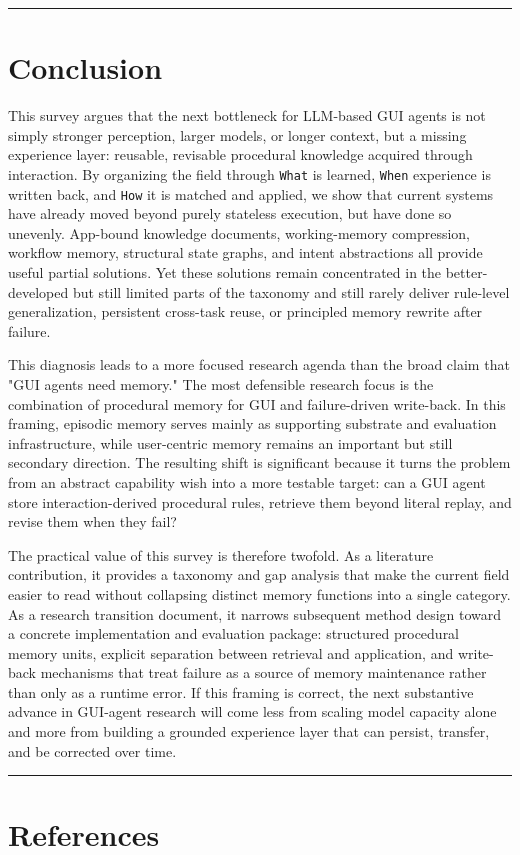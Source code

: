 \documentclass{article}
\begin{document}
\begin{center}\rule{0.5\linewidth}{0.5pt}\end{center}

\section{Conclusion}\label{10-conclusion}

This survey argues that the next bottleneck for LLM-based GUI agents is
not simply stronger perception, larger models, or longer context, but a
missing experience layer: reusable, revisable procedural knowledge
acquired through interaction. By organizing the field through
\texttt{What} is learned, \texttt{When} experience is written back, and
\texttt{How} it is matched and applied, we show that current systems
have already moved beyond purely stateless execution, but have done so
unevenly. App-bound knowledge documents, working-memory compression,
workflow memory, structural state graphs, and intent abstractions all
provide useful partial solutions. Yet these solutions remain
concentrated in the better-developed but still limited parts of the
taxonomy and still rarely deliver rule-level generalization, persistent
cross-task reuse, or principled memory rewrite after failure.

This diagnosis leads to a more focused research agenda than the broad
claim that "GUI agents need memory." The most defensible research focus
is the combination of procedural memory for GUI and failure-driven
write-back. In this framing, episodic memory serves mainly as supporting
substrate and evaluation infrastructure, while user-centric memory
remains an important but still secondary direction. The resulting shift
is significant because it turns the problem from an abstract capability
wish into a more testable target: can a GUI agent store
interaction-derived procedural rules, retrieve them beyond literal
replay, and revise them when they fail?

The practical value of this survey is therefore twofold. As a literature
contribution, it provides a taxonomy and gap analysis that make the
current field easier to read without collapsing distinct memory
functions into a single category. As a research transition document, it
narrows subsequent method design toward a concrete implementation and
evaluation package: structured procedural memory units, explicit
separation between retrieval and application, and write-back mechanisms
that treat failure as a source of memory maintenance rather than only as
a runtime error. If this framing is correct, the next substantive
advance in GUI-agent research will come less from scaling model capacity
alone and more from building a grounded experience layer that can
persist, transfer, and be corrected over time.

\begin{center}\rule{0.5\linewidth}{0.5pt}\end{center}

\section{References}

\nocite{*}
\printbibliography[heading=none]
\end{document}
